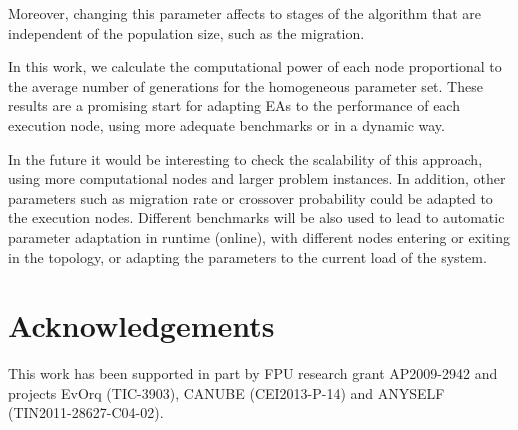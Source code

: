 \documentclass[final,1p,times]{elsarticle}
\begin{document}
Moreover, changing this parameter affects to stages
of the algorithm that are independent of the population size, such as
the migration. 

In this work, we calculate the computational power of each node proportional 
to the average number of generations for the homogeneous parameter set. These results are a promising start for adapting EAs to the
performance of each execution node, using more adequate benchmarks or in a dynamic way. 

In the future it would be interesting to check the scalability of this
approach, using more computational nodes and larger problem
instances. In addition, other parameters such as migration rate or
crossover probability could be adapted to the execution
nodes. Different benchmarks will be also used to lead to automatic
parameter adaptation in runtime (online), with different nodes entering or
exiting in the topology, or adapting the parameters to the current load of the
system. 

\section*{Acknowledgements}
This work has been supported in part by FPU research grant AP2009-2942 and projects EvOrq (TIC-3903), CANUBE (CEI2013-P-14) and ANYSELF (TIN2011-28627-C04-02).




%
%









\end{document}
